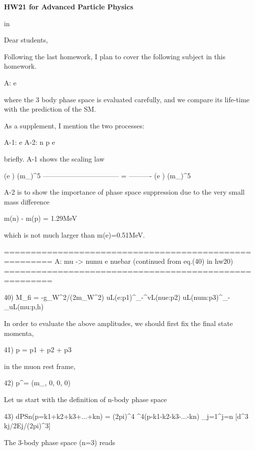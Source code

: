 \documentclass[12pt]{article}
\begin{document}
\begin{center}
{\large\bf HW21 for Advanced Particle Physics} \\
  
\end{center}

 in

Dear students,

  Following the last homework, I plan to cover the following subject
  in this homework.

  A: \mu \to \numu e \nuebar

  where the 3 body phase space is evaluated carefully, and
  we compare its life-time with the prediction of the SM.

  As a supplement, I mention the two processes:

  A-1: \tau \to \nutau e \nuebar
  A-2: n    \to p      e \nuebar

  briefly.  A-1 shows the scaling law

  \Gamma(\tau \to \nutau e \nuebar)   (m_\tau)^5
  --------------------------------- = ----------
  \Gamma(\mu  \to \numu  e \nuebar)    (m_\mu)^5

  A-2 is to show the importance of phase space suppression
  due to the very small mass difference

  m(n) - m(p) = 1.29MeV

  which is not much larger than m(e)=0.51MeV.

  =======================================================
  A: mu -> numu e nuebar (continued from eq.(40) in hw20)
  =======================================================

  40) M_{fi} = -g_W^2/(2m_W^2)
                uL(e:p1)^\dagger   \sigma_-^\mu vL(nue:p2)
                uL(num:p3)^\dagger \sigma_-_\mu uL(mu:p,h)

  In order to evaluate the above amplitudes, we should first fix the
  final state momenta,

  41) p = p1 + p2 + p3

  in the muon rest frame,

  42) p^\mu = (m_\mu, 0, 0, 0)

  Let us start with the definition of n-body phase space

  43) dPSn(p=k1+k2+k3+...+kn) = (2pi)^4 \delta^4(p-k1-k2-k3-...-kn)
                                \Pi_{j=1}^{j=n} [d^3 kj/2Ej/(2pi)^3]

  The 3-body phase space (n=3) reads
\end{document}
